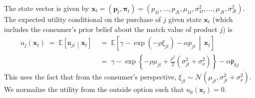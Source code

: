 \documentclass[11pt]{article}
\newcommand{\E}{\mathbb{E}}
\newcommand{\N}{\mathcal{N}}
\begin{document}
\noindent The state vector is given by $\boldsymbol{x}_{t}=\left(\boldsymbol{p}_{t}, \boldsymbol{\pi}_{t}\right)=\left(p_{1 t}, \ldots, p_{J t}, \mu_{1 t}, \sigma_{1 t}^{2}, \ldots, \mu_{J t}, \sigma_{J t}^{2}\right)$. The expected utility conditional on the purchase of $j$ given state $\boldsymbol{x}_t$ (which includes the consumer's prior belief about the match value of product $j$) is
\begin{align*}
u_{j}\left(\boldsymbol{x}_{t}\right) \; = \; \E\left[ \mathfrak{u}_{jt} \middle| \boldsymbol{x}_{t} \right] \; & = \;  \E\left[\gamma-\exp \left(-\rho \xi_{j t}\right)-\alpha p_{j t}\, \middle|\, \boldsymbol{x}_{t}\right]\\
& = \; \gamma - \exp \left\{ -\rho \mu_{jt} + \frac{\rho^2}{2} \left( \sigma^2_{jt} + \sigma^2_{\nu}\right) \right\} - \alpha \mathfrak{p}_{kj} 
\end{align*}
This uses the fact that from the consumer's perspective, $\xi_{jt} \sim \N(\mu_{jt}, \sigma^2_{jt} + \sigma^2_\nu)$. We normalize the utility from the outside option such that $u_0 \left( \boldsymbol{x}_t \right) = 0$. 
\end{document}

